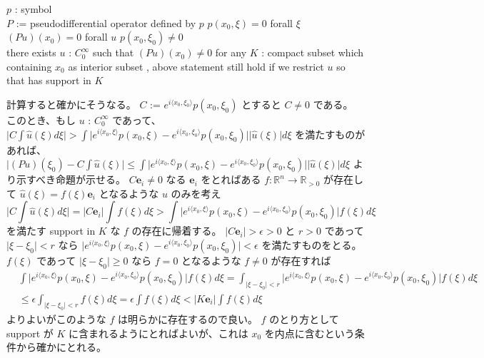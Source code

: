 \begin{Theorem}
\itemwhen
  \Fix \(p\) : symbol \\
  \Let \(P\) := pseudodifferential operator defined by \(p\)
\itemprop
  \IfHold \(p(x_0 , \xi) = 0\) forall \(\xi\) \\
  \Then \((Pu)(x_0) = 0\) forall \(u\)
\itemprop
  \IfHold \(p(x_0 , \xi_0) \not = 0\) \\
  \Then there exists \(u\) : \(C^\infty_0\) such that \((Pu)(x_0) \not = 0\)
\itemprop
  \Then for any \(K\) : compact subset which containing \(x_0\) as interior subset , above statement still hold if we restrict \(u\) so that has support in \(K\)
\end{Theorem}

\begin{Proof}
\itemprof
  計算すると確かにそうなる。
\itemprof
  \(C\) := \(e^{i \langle x_0 , \xi_0 \rangle} p(x_0 , \xi_0)\) とすると \(C \not = 0\) である。
  このとき、もし \(u\) : \(C^\infty_0\) であって、 \(\lvert C \int \hat{u}(\xi) d\xi \rvert > \int \lvert e^{i \langle x_0 , \xi \rangle} p(x_0 , \xi) - e^{i \langle x_0 , \xi_0 \rangle} p(x_0 , \xi_0) \rvert \lvert \hat{u}(\xi) \rvert d\xi\) を満たすものがあれば、 \(\lvert (Pu)(\xi_0) - C \int \hat{u}(\xi) \rvert \leq \int \lvert e^{i \langle x_0 , \xi \rangle} p(x_0 , \xi) - e^{i \langle x_0 , \xi_0 \rangle} p(x_0 , \xi_0) \rvert \lvert \hat{u}(\xi) \rvert d\xi\) より示すべき命題が示せる。
  \(C \mathbf{e}_i \not = 0\) なる \(\mathbf{e}_i\) をとればある \(f : \mathbb{R}^n \to \mathbb{R}_{>0}\) が存在して \(\hat{u}(\xi) = f(\xi) \mathbf{e}_i\) となるような \(u\) のみを考え
  \[
    \lvert C \int \hat{u}(\xi) d\xi \rvert = \lvert C \mathbf{e}_i \rvert \int f(\xi) d\xi > \int \lvert e^{i \langle x_0 , \xi \rangle} p(x_0 , \xi) - e^{i \langle x_0 , \xi_0 \rangle} p(x_0 , \xi_0) \rvert f(\xi) d\xi
  \]
  を満たす support in \(K\) な \(f\) の存在に帰着する。
  \(\lvert C \mathbf{e}_i \rvert > \epsilon > 0\) と \(r > 0\) であって \(\lvert \xi - \xi_0 \rvert < r\) なら \(\lvert e^{i \langle x_0 , \xi \rangle} p(x_0 , \xi) - e^{i \langle x_0 , \xi_0 \rangle} p(x_0 , \xi_0) \rvert < \epsilon\) を満たすものをとる。
  \(f(\xi)\) であって \(\lvert \xi - \xi_0 \rvert \geq 0\) なら \(f = 0\) となるような \(f \not = 0\) が存在すれば
  \begin{align*}
    &\int \lvert e^{i \langle x_0 , \xi \rangle} p(x_0 , \xi) - e^{i \langle x_0 , \xi_0 \rangle} p(x_0 , \xi_0) \rvert f(\xi) d\xi
    = \int_{\lvert \xi - \xi_0 \rvert < r} \lvert e^{i \langle x_0 , \xi \rangle} p(x_0 , \xi) - e^{i \langle x_0 , \xi_0 \rangle} p(x_0 , \xi_0) \rvert f(\xi) d\xi \\
    &\leq \epsilon \int_{\lvert \xi - \xi_0 \rvert < r} f(\xi) d\xi = \epsilon \int f(\xi) d\xi < \lvert K \mathbf{e}_i \rvert \int f(\xi) d\xi
  \end{align*}
  よりよいがこのような \(f\) は明らかに存在するので良い。
\itemprof
  \(f\) のとり方として support が \(K\) に含まれるようにとればよいが、これは \(x_0\) を内点に含むという条件から確かにとれる。
\end{Proof}

